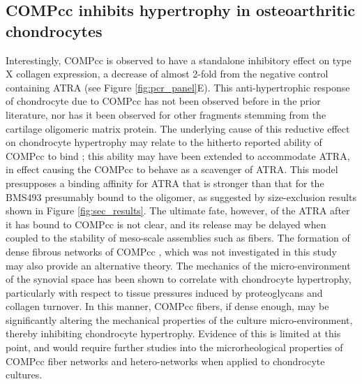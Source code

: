 \begin{refsection}
\subsection{COMPcc inhibits hypertrophy in osteoarthritic chondrocytes}
\label{sec:discuss_hypertrophy}
Interestingly, COMPcc is observed to have a standalone inhibitory effect on type X
collagen expression, a decrease of almost 2-fold from the negative control
containing ATRA (see Figure \ref{fig:pcr_panel}E). This anti-hypertrophic response
of chondrocyte due to COMPcc has not been observed before in the prior literature,
nor has it been observed for other fragments stemming from the cartilage
oligomeric matrix protein. The underlying cause of this reductive effect on
chondrocyte hypertrophy may relate to the hitherto reported ability of COMPcc to
bind ;\cite{Guo1998} this ability may have been
extended to accommodate ATRA, in effect causing the COMPcc to behave as a scavenger
of ATRA. This model presupposes a binding affinity for ATRA that is stronger than
that for the BMS493 presumably bound to the oligomer, as suggested by
size-exclusion results shown in Figure \ref{fig:sec_results}. The ultimate fate,
however, of the ATRA after it has bound to COMPcc is not clear, and its release may
be delayed when coupled to the stability of meso-scale assemblies such as
fibers. The formation of dense fibrous networks of COMPcc , which
was not investigated in this study may also provide an alternative theory. The
mechanics of the micro-environment of the synovial space has been shown to
correlate with chondrocyte hypertrophy, particularly with respect to tissue
pressures induced by proteoglycans and collagen turnover.\cite{VanDonkelaar2012}
In this manner, COMPcc fibers, if dense enough, may be significantly altering the
mechanical properties of the culture micro-environment, thereby inhibiting
chondrocyte hypertrophy. Evidence of this is limited at this point, and would
require further studies into the microrheological properties of COMPcc fiber
networks and hetero-networks when applied to chondrocyte cultures.


\end{refsection}
